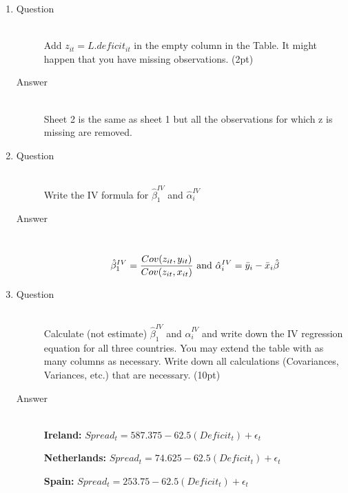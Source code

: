 \documentclass{article}
\begin{document}
\begin{enumerate}
\begin{description}
  \end{description}
  
  \item
  \begin{description}
    \item[Question] \hfill \\
    Add \(z_{it} = L.deficit_{it} \) in the empty column in the Table. It might happen that you have missing observations. (2pt)
    \item[Answer] \hfill \\
    Sheet 2 is the same as sheet 1 but all the observations for which z is missing are removed.
  \end{description}
  
  \item
  \begin{description}
    \item[Question] \hfill \\
    Write the IV formula for \(\hat{\beta}^{IV}_1\) and \(\hat{\alpha}^{IV}_i\)
    \item[Answer] \hfill \\
    
    \[ \hat{\beta}^{IV}_1 = \frac{Cov(z_{it},y_{it})}{Cov(z_{it},x_{it})} \textnormal{ and } \hat{\alpha}^{IV}_i = \bar{y}_{i} - \bar{x}_{i}\hat{\beta} \]
    
  \end{description}
  
  \item
  \begin{description}
    \item[Question] \hfill \\
    Calculate (not estimate) \(\hat{\beta}^{IV}_1\) and \(\hat{\alpha}^{IV}_i\) and write down the IV regression equation for all three countries. You may extend the table with as many columns as necessary. Write down all calculations (Covariances, Variances, etc.) that are necessary. (10pt)
    \item[Answer] \hfill \\
    
    \textbf{Ireland:} \( Spread_{t} = 587.375 -62.5(Deficit_{t}) + \epsilon_t \)
    
    \textbf{Netherlands:} \( Spread_{t} = 74.625 -62.5(Deficit_{t}) + \epsilon_t \)
    
    \textbf{Spain:} \( Spread_{t} = 253.75 -62.5(Deficit_{t}) + \epsilon_t \)
    
  \end{description}
  
\end{enumerate}
\end{document}
